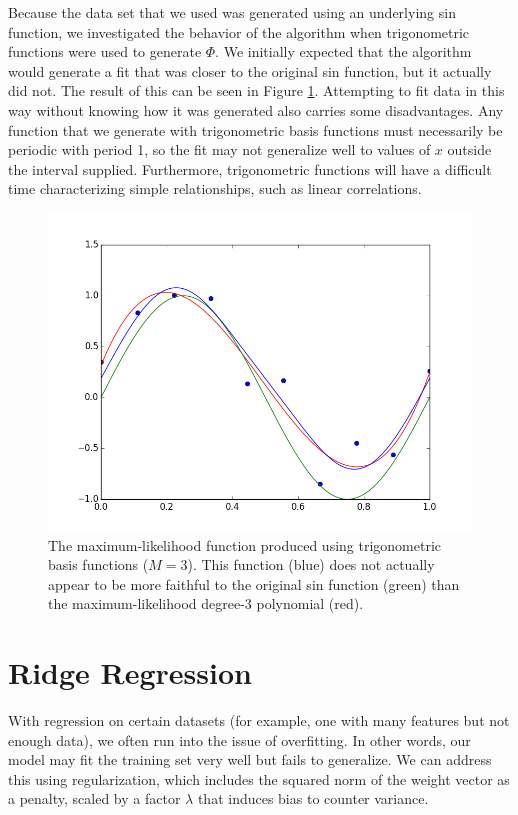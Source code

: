 \documentclass{article}
\begin{document}
Because the data set that we used was generated using an underlying sin function, we investigated the behavior of the algorithm when trigonometric functions were used to generate $\Phi$. We initially expected that the algorithm would generate a fit that was closer to the original sin function, but it actually did not. The result of this can be seen in Figure \ref{p2figure2}. Attempting to fit data in this way without knowing how it was generated also carries some disadvantages. Any function that we generate with trigonometric basis functions must necessarily be periodic with period 1, so the fit may not generalize well to values of $x$ outside the interval supplied. Furthermore, trigonometric functions will have a difficult time characterizing simple relationships, such as linear correlations.

\begin{figure}
\label{p2figure2}
\includegraphics[scale=0.4]{figure2_3.png}
\caption{The maximum-likelihood function produced using trigonometric basis functions ($M=3$). This function (blue) does not actually appear to be more faithful to the original sin function (green) than the maximum-likelihood degree-3 polynomial (red).}
\end{figure}

\section{Ridge Regression}
With regression on certain datasets (for example, one with many features but not enough data), we often run into the issue of overfitting. In other words, our model may fit the training set very well but fails to generalize. We can address this using regularization, which includes the squared norm of the weight vector as a penalty, scaled by a factor $\lambda$ that induces bias to counter variance. 
\end{document}
